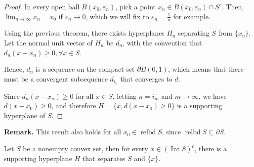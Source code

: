 \begin{proof}
  In every open ball \( B(x_{0}, \varepsilon_{n}) \), pick a point \( x_{n} \in
  B(x_{0}, \varepsilon_{n}) \cap  S^{c}\). Then, \( \lim_{n \to \infty} x_{n} =
  x_{0}\) if \( \varepsilon_{n} \to  0 \), which we will fix to \( \varepsilon_{n}
  = \frac{1}{n}\) for example.

  Using the previous theorem, there exists hyperplanes \( H_{n} \) separating \(
  S\) from \( \{x_{n}\}   \). Let the normal unit vector of \( H_{n} \) be \(
  d_{n} \), with the convention that \( d_{n}(x-x_{n}) \ge 0, \forall  x \in
  S \).

  Hence, \( d_{n} \) is a sequence on the compact set \( \partial B(0, 1) \),
  which means that there must be a convergent subsequence \( d_{i_{n}} \) that
  converges to \( d \).

  Since \( d_{n}(x-x_{n}) \ge 0 \) for all \( x \in S \), letting \( n = i_{m}
  \) and \( m \to  \infty \), we have \( d(x-x_{0}) \ge 0 \), and therefore \(
  H=\{x, d(x-x_{0})\ge 0\}   \) is a supporting hyperplane of \( S \).
\end{proof}

\textbf{Remark. } This result also holds for all \( x_{0} \in
\operatorname{relbd} S
\), since \( \operatorname{relbd} S \subseteq \partial S \).

\begin{corollary}
\label{cor:hst-set-pt}
  Let \( S \) be a nonempty convex set, then for every \( x \in
  (\operatorname{Int} S)^{c} \), there is a supporting hyperplane \( H \) that
  separates \( S \) and \( \{ x\}   \).
\end{corollary}

